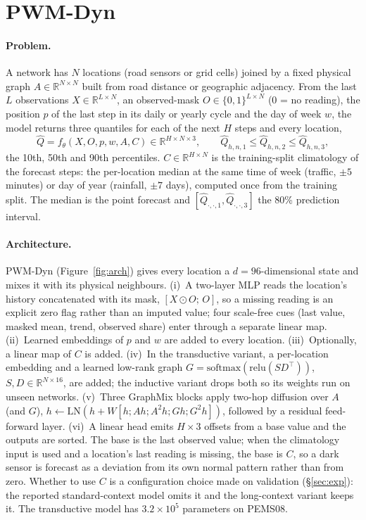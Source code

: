 \section{PWM-Dyn}
\label{sec:model}

\paragraph{Problem.} A network has $N$ locations (road sensors or grid cells) joined by a fixed physical
graph $A\in\mathbb{R}^{N\times N}$ built from road distance or geographic adjacency. From the last $L$ observations
$X\in\mathbb{R}^{L\times N}$, an observed-mask $O\in\{0,1\}^{L\times N}$ (0 = no reading), the position $p$ of the last
step in its daily or yearly cycle and the day of week $w$, the model returns three quantiles for each of the next $H$
steps and every location,
\begin{equation}
\hat Q = f_\theta(X, O, p, w, A, C)\in\mathbb{R}^{H\times N\times 3},\qquad \hat Q_{h,n,1}\le\hat Q_{h,n,2}\le\hat Q_{h,n,3},
\end{equation}
the 10th, 50th and 90th percentiles. $C\in\mathbb{R}^{H\times N}$ is the training-split climatology of the
forecast steps: the per-location median at the same time of week (traffic, $\pm 5$ minutes) or day of year
(rainfall, $\pm 7$ days), computed once from the training split. The median is the point forecast and
$[\hat Q_{\cdot,\cdot,1},\hat Q_{\cdot,\cdot,3}]$ the 80\% prediction interval.

\paragraph{Architecture.} PWM-Dyn (Figure~\ref{fig:arch}) gives every location a $d{=}96$-dimensional state and mixes
it with its physical neighbours. (i)~A two-layer MLP reads the location's history concatenated with its mask,
$[X\odot O;\,O]$, so a missing reading is an explicit zero flag rather than an imputed value; four scale-free cues
(last value, masked mean, trend, observed share) enter through a separate linear map. (ii)~Learned embeddings of
$p$ and $w$ are added to every location. (iii)~Optionally, a linear map of $C$ is added. (iv)~In the transductive variant, a
per-location embedding and a learned low-rank graph $G=\mathrm{softmax}(\mathrm{relu}(SD^\top))$, $S,D\in\mathbb{R}^{N\times 16}$,
are added; the inductive variant drops both so its weights run on unseen networks. (v)~Three GraphMix blocks
apply two-hop diffusion over $A$ (and $G$), $h\leftarrow\mathrm{LN}(h+W[h;Ah;A^2h;Gh;G^2h])$, followed by a
residual feed-forward layer. (vi)~A linear head emits $H\times 3$ offsets from a base value and the outputs are sorted.
The base is the last observed value; when the climatology input is used and a location's last reading is missing,
the base is $C$, so a dark sensor is forecast as a deviation from its own normal pattern rather than from zero.
Whether to use $C$ is a configuration choice made on validation (\S\ref{sec:exp}): the reported standard-context
model omits it and the long-context variant keeps it. The transductive model has $3.2\times10^5$ parameters on PEMS08.

